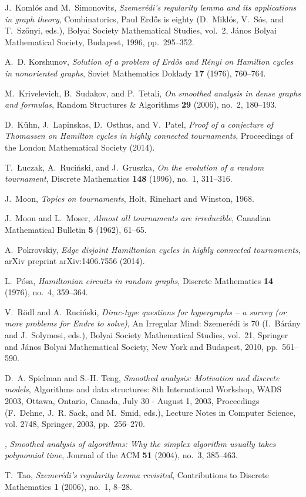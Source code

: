 \documentclass[11pt,english]{article}
\theoremstyle{plain}
\theoremstyle{definition}
\theoremstyle{definition}
\theoremstyle{plain}
\theoremstyle{plain}
\theoremstyle{plain}
\theoremstyle{plain}
\theoremstyle{remark}
\theoremstyle{remark}
\begin{document}
\begin{thebibliography}{10}
J.~Koml\'os and M.~Simonovits, \emph{Szemer\'edi's regularity lemma and its
  applications in graph theory}, Combinatorics, {P}aul {E}rd\H{o}s is eighty
  (D.~Mikl\'os, V.~S\'os, and T.~Sz\H{o}nyi, eds.), Bolyai Society Mathematical
  Studies, vol.~2, J\'anos {B}olyai Mathematical Society, Budapest, 1996,
  pp.~295--352.

A.~D. Korshunov, \emph{Solution of a problem of {E}rd\H{o}s and {R}\'enyi on {H}amilton cycles in nonoriented graphs}, Soviet Mathematics Doklady \textbf{17} (1976), 760--764.

M.~Krivelevich, B.~Sudakov, and P.~Tetali, \emph{On smoothed analysis in dense
  graphs and formulas}, Random Structures \& Algorithms \textbf{29} (2006),
  no.~2, 180--193.

D.~K{\"u}hn, J.~Lapinskas, D.~Osthus, and V.~Patel, \emph{Proof of a conjecture
  of {T}homassen on {H}amilton cycles in highly connected tournaments},
  Proceedings of the London Mathematical Society (2014).

T.~{\L}uczak, A.~Ruci{\'n}ski, and J.~Gruszka, \emph{On the evolution of a
  random tournament}, Discrete Mathematics \textbf{148} (1996), no.~1,
  311--316.

J.~Moon, \emph{Topics on tournaments}, Holt, Rinehart and Winston, 1968.

J.~Moon and L.~Moser, \emph{Almost all tournaments are irreducible}, Canadian
  Mathematical Bulletin \textbf{5} (1962), 61--65.

A.~Pokrovskiy, \emph{Edge disjoint {H}amiltonian cycles in highly connected
  tournaments}, arXiv preprint arXiv:1406.7556 (2014).

L.~P{\'o}sa, \emph{{H}amiltonian circuits in random graphs}, Discrete
  Mathematics \textbf{14} (1976), no.~4, 359--364.

V.~R{\"o}dl and A.~Ruci{\'n}ski, \emph{Dirac-type questions for hypergraphs --
  a survey (or more problems for {E}ndre to solve)}, An Irregular Mind:
  Szemer\'edi is 70 (I.~B\'ar\'any and J.~Solymosi, eds.), Bolyai Society
  Mathematical Studies, vol.~21, Springer and J\'anos Bolyai Mathematical
  Society, New York and Budapest, 2010, pp.~561--590.

D.~A. Spielman and S.-H. Teng, \emph{Smoothed analysis: Motivation and discrete
  models}, Algorithms and data structures: 8th International Workshop, WADS
  2003, Ottawa, Ontario, Canada, July 30 - August 1, 2003, Proceedings
  (F.~Dehne, J.~R. Sack, and M.~Smid, eds.), Lecture Notes in Computer Science,
  vol. 2748, Springer, 2003, pp.~256--270.

\bysame, \emph{Smoothed analysis of algorithms: Why the simplex algorithm
  usually takes polynomial time}, Journal of the ACM \textbf{51} (2004), no.~3,
  385--463.

T.~Tao, \emph{Szemer\'edi's regularity lemma revisited}, Contributions to
  Discrete Mathematics \textbf{1} (2006), no.~1, 8--28.

\end{thebibliography}
\end{document}
